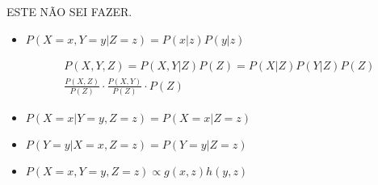 \item




ESTE NÃO SEI FAZER.

\begin{itemize}
  \item $P(X = x, Y = y|Z = z) = P(x|z)P(y|z)$

  \[\begin{array}{l}
  P(X,Y,Z) = P(X,Y | Z)P(Z)=P(X|Z)P(Y|Z)P(Z) \\
  \frac{P(X,Z)}{P(Z)} \cdot \frac{P(X,Y)}{P(Z)} \cdot P(Z)
  \end{array}\]

  \item $P(X = x|Y = y,Z = z) = P(X = x|Z = z)$


  \item $P(Y = y|X = x,Z = z) = P(Y = y|Z = z)$

  \item $P(X = x,Y = y,Z = z) \propto g(x,z)h(y,z)$

\end{itemize}
